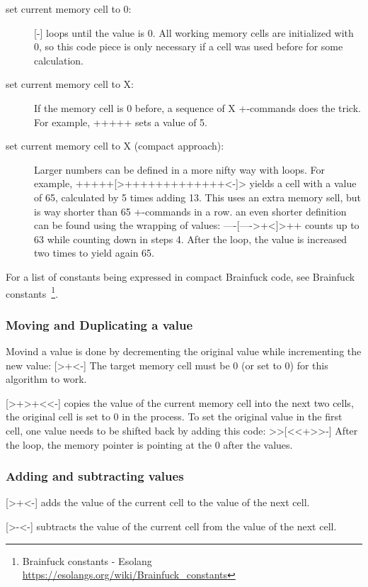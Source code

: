 \documentclass[ms,article,a4paper]{memoir}
\begin{document}
\begin{description}
\item[set current memory cell to 0:] 
[-] loops until the value is 0. All working memory cells are initialized with 0, so this code piece is only necessary if a cell was used before for some calculation.
\item[set current memory cell to X:] 
If the memory cell is 0 before, a sequence of X +-commands does the trick. For example, +++++ sets a value of 5. 
\item[set current memory cell to X (compact approach):] 
Larger numbers can be defined in a more nifty way with loops. For example, +++++[>+++++++++++++<-]> yields a cell with a value of 65, calculated by 5 times adding 13. This uses an extra memory sell, but is way shorter than 65 +-commands in a row. an even shorter definition can be found using the wrapping of values: ----[---->+<]>++ counts up to 63 while counting down in steps 4. After the loop, the value is increased two times to yield again 65.
\end{description}

For a list of constants being expressed in compact Brainfuck code, see Brainfuck constants~\footnote{Brainfuck constants - Esolang \url{https://esolangs.org/wiki/Brainfuck_constants}}.

\subsubsection{Moving and Duplicating a value}

Movind a value is done by decrementing the original value while incrementing the new value: [>+<-] The target memory cell must be 0 (or set to 0) for this algorithm to work.

[>+>+<<-] copies the value of the current memory cell into the next two cells, the original cell is set to 0 in the process.
To set the original value in the first cell, one value needs to be shifted back by adding this code: >>[<<+>>-] After the loop, the memory pointer is pointing at the 0 after the values.

\subsubsection{Adding and subtracting values}

[>+<-] adds the value of the current cell to the value of the next cell.

[>-<-] subtracts the value of the current cell from the value of the next cell.
\end{document}
